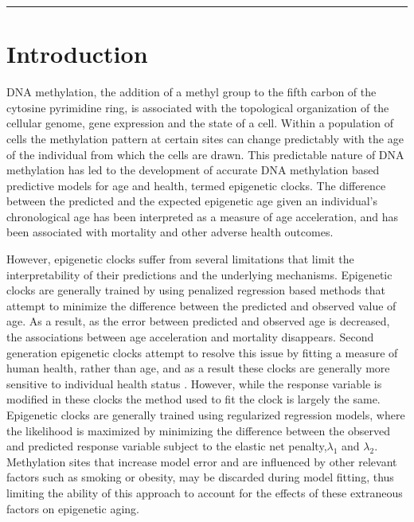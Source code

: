 \documentclass{article}
\begin{document}
{\begin{linenumbers}
\begin{center}\rule{0.9\linewidth}{0.5pt}\end{center}
\section{Introduction}

DNA methylation, the addition of a methyl group to the fifth carbon of the cytosine pyrimidine ring,  is 
associated with the topological organization of the cellular genome, gene expression and the state of 
a cell. Within a population of cells the methylation pattern at certain sites can change predictably 
with the age of the individual from which the cells are drawn. This predictable nature of DNA 
methylation has led to the development of accurate DNA methylation based predictive models for 
age and health, termed epigenetic clocks. The difference between the predicted and the expected 
epigenetic age given an individual's chronological age has been interpreted as a measure of age 
acceleration\cite{Horvath2018-ia}, and has been associated with mortality\cite{Perna2016-pi,Marioni2015-sn} 
and other adverse health outcomes\cite{Dugue2018-ad,Huang2019-hf,Armstrong2017-vg,Chuang2017-nk,Horvath2015-af}. 

However, epigenetic clocks suffer from several limitations that limit the interpretability of their 
predictions and the underlying mechanisms. Epigenetic clocks are generally trained by using penalized regression 
based methods that attempt to minimize the difference between the predicted and observed value of  age. As a result, 
as the error between predicted and observed age is decreased, the associations between age acceleration and mortality 
disappears\cite{Zhang2019-br}. Second generation epigenetic clocks attempt to resolve this issue by fitting a measure 
of human health, rather than age, and as a result these clocks are generally more sensitive to individual health 
status \cite{Lu2019-lg,Levine2018-en,Belsky2020-ha}. However, while the response variable is modified in these 
clocks the method used to fit the clock is largely the same. Epigenetic clocks are generally trained using 
regularized regression models, where the likelihood is maximized by minimizing the difference between the 
observed and predicted response variable subject to the elastic net penalty,$\lambda_1$ and $\lambda_2$. 
Methylation sites that increase model error and are influenced by other relevant factors such as smoking or obesity, 
may be discarded during model fitting, thus limiting the ability of this approach to account for the effects of these 
extraneous factors on epigenetic aging. 


\end{linenumbers}}
\end{document}
